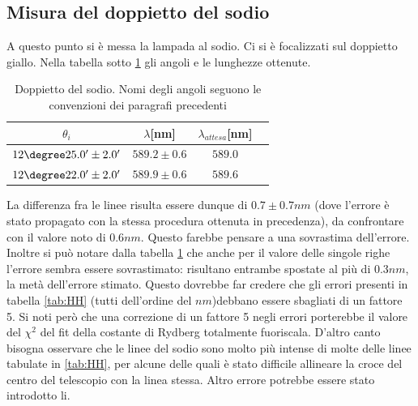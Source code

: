\documentclass[a4paper,10pt]{article}
\begin{document}
{{{{{{{{\subsection{Misura del doppietto del sodio}
A questo punto si è messa la lampada al sodio. Ci si è focalizzati sul doppietto giallo. Nella tabella sotto \ref{tab:NaR} gli angoli e le lunghezze ottenute.

\begin{table}[H]
	\centering
	\begin{tabular}{c|c|c|c}
		$\theta_i$ & $\lambda$[nm] & $\lambda_{attesa}$[nm]  \\
		\hline
  $ 12\degree 25.0' \pm 2.0 ' $ & $ 589.2 \pm 0.6 $ & $ 589.0 $ \\
  $ 12\degree 22.0' \pm 2.0 ' $ & $ 589.9 \pm 0.6 $ & $ 589.6 $ \\
\end{tabular}
	\caption{Doppietto del sodio. Nomi degli angoli seguono le convenzioni dei paragrafi precedenti}
	\label{tab:NaR}
\end{table}

La differenza fra le linee risulta essere dunque di $0.7\pm 0.7 nm$ (dove l'errore è stato propagato con la stessa procedura ottenuta in precedenza), da confrontare con il valore noto di $0.6 nm$. Questo farebbe pensare a una sovrastima dell'errore. Inoltre si può notare dalla tabella \ref{tab:NaR} che anche per il valore delle singole righe l'errore sembra essere sovrastimato: risultano entrambe spostate al più di $0.3 nm$, la metà dell'errore stimato.
Questo dovrebbe far credere che gli errori presenti in tabella \ref{tab:HH} (tutti dell'ordine del $nm$)debbano essere sbagliati di un fattore 5. Si noti però che una correzione di un fattore 5 negli errori porterebbe il valore del $\chi^2$ del fit della costante di Rydberg totalmente fuoriscala. D'altro canto bisogna osservare che le linee del sodio sono molto più intense di molte delle linee tabulate in \ref{tab:HH}, per alcune delle quali è stato difficile allineare la croce del centro del telescopio con la linea stessa. Altro errore potrebbe essere stato introdotto li. 


}}}}}}}}
\end{document}
